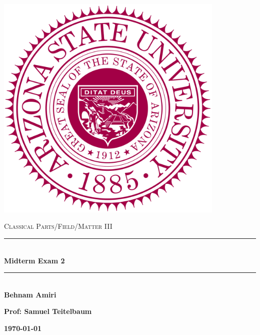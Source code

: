 \documentclass[fleqn]{article}
\begin{document}
  \begin{titlepage}

    \newcommand{\HRule}{\rule{\linewidth}{0.5mm}}

    \center

    \begin{center}
      \includegraphics[height=11cm, width=11cm]{asu.png}
    \end{center}

    \vline

    \textsc{\LARGE Classical Parts/Field/Matter III}\\[1.5cm]

    \HRule \\[0.5cm]
    { \huge \bfseries Midterm Exam 2}\\[0.4cm] 
    \HRule \\[1.0cm]

    \textbf{Behnam Amiri}

    \bigbreak

    \textbf{Prof: Samuel Teitelbaum}

    \bigbreak

    \textbf{{\large \today}\\[2cm]}

    \vfill

  \end{titlepage}
\end{document}
